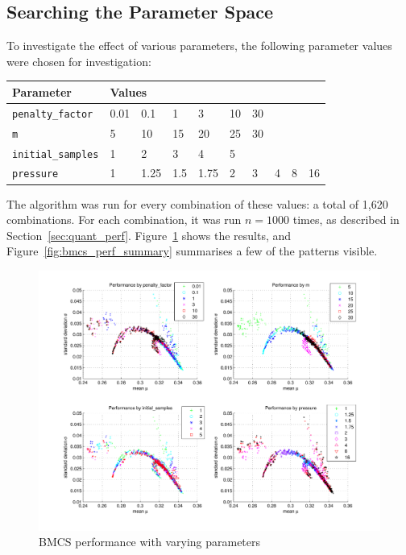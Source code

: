 \documentclass[10pt]{article}
\begin{document}
\subsection{Searching the Parameter Space}

To investigate the effect of various parameters, the following parameter
values were chosen for investigation:

\vspace{5pt}

\begin{tabular}{l | l l l l l l l l l}
  Parameter & \multicolumn{9}{l}{Values} \\
  \hline
  \texttt{penalty\_factor} & 0.01 & 0.1 & 1 & 3 & 10 & 30 \\
  \texttt{m} & 5 & 10 & 15 & 20 & 25 & 30 \\
  \texttt{initial\_samples} & 1 & 2 & 3 & 4 & 5 \\
  \texttt{pressure} & 1 & 1.25 & 1.5 & 1.75 & 2 & 3 & 4 & 8 & 16
  \end{tabular}

\vspace{5pt}

The algorithm was run for every combination of these values: a total of 1,620
combinations. For each combination, it was run $n = 1000$ times, as described
in Section~\ref{sec:quant_perf}. Figure~\ref{fig:bmcs_perf_scatters} shows the
results, and Figure~\ref{fig:bmcs_perf_summary} summarises a few of the
patterns visible.

\begin{figure}[tbp]
  \advance\leftskip-1cm
  \includegraphics[clip, trim=1.5cm 0.75cm 1.5cm 0.75cm, width=18.5cm]{bmcs_perf_scatters.pdf}
  \caption{BMCS performance with varying parameters}
  \label{fig:bmcs_perf_scatters}
  \end{figure}
\end{document}
